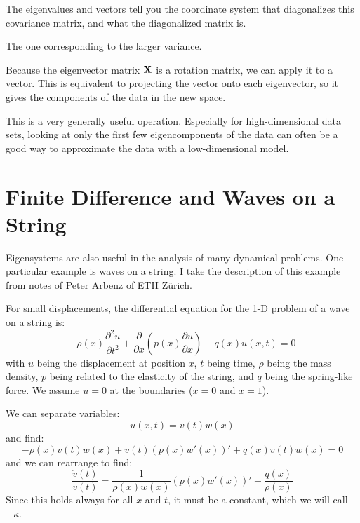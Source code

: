 
The eigenvalues and vectors tell you the coordinate system that
diagonalizes this covariance matrix, and what the diagonalized matrix
is.


\begin{answer}
The one corresponding to the larger variance.
\end{answer}

Because the eigenvector matrix ${\bf X}$ is a rotation matrix, we can
apply it to a vector.  This is equivalent to projecting the vector
onto each eigenvector, so it gives the components of the data in the
new space.

This is a very generally useful operation. Especially for
high-dimensional data sets, looking at only the first few
eigencomponents of the data can often be a good way to approximate the
data with a low-dimensional model.

\section{Finite Difference and Waves on a String}

Eigensystems are also useful in the analysis of many dynamical
problems. One particular example is waves on a string. I take the
description of this example from notes of Peter Arbenz of ETH
Z\"urich.

For small displacements, the differential equation for the 1-D problem
of a wave on a string is:
\begin{equation}
- \rho(x) \frac{\partial^2 u}{\partial t^2}
+ \frac{\partial }{\partial x}\left(p(x) \frac{\partial u}{\partial
  x}\right)
+ q(x) u(x, t) = 0
\end{equation}
with $u$ being the displacement at position $x$, $t$ being time,
$\rho$ being the mass density, $p$ being related to the elasticity of
the string, and $q$ being the spring-like force. We assume $u=0$ at
the boundaries ($x=0$ and $x=1$).

We can separate variables:
\begin{equation}
u(x, t) = v(t) w(x)
\end{equation}
and find:
\begin{equation}
- \rho(x) \ddot{v}(t) w(x) + v(t) \left(p(x) w'(x)\right)' + q(x)v(t) w(x) = 0
\end{equation}
and we can rearrange to find:
\begin{equation}
\frac{\ddot{v}(t)}{v(t)} = \frac{1}{\rho(x) w(x)}\left(p(x)
w'(x)\right)' + \frac{q(x)}{\rho(x)}
\end{equation}
Since this holds always for all $x$ and $t$, it must be a constant,
which we will call $-\kappa$. 

